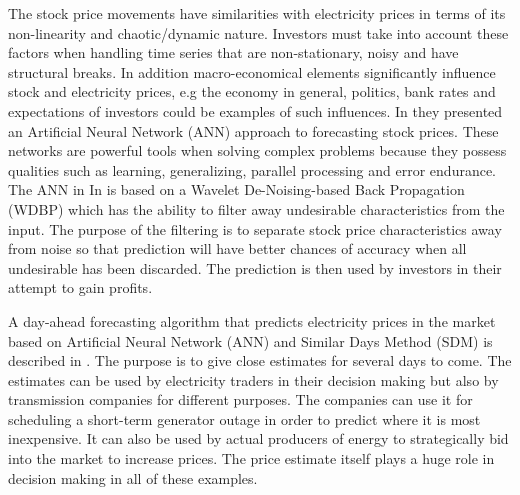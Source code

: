 The stock price movements have similarities with electricity prices in terms of its non-linearity and chaotic/dynamic nature. Investors must take into account these factors when handling time series that are non-stationary, noisy and have structural breaks\cite{stockForecasting}. In addition macro-economical elements significantly influence stock and electricity prices, e.g the economy in general, politics, bank rates and expectations of investors could be examples of such influences. In \cite{stockForecasting} they presented an Artificial Neural Network (ANN) approach to forecasting stock prices. These networks are powerful tools when solving complex problems because they possess qualities such as learning, generalizing, parallel processing and error endurance. The ANN in In \cite{stockForecasting} is based on a Wavelet De-Noising-based Back Propagation (WDBP) which has the ability to filter away undesirable characteristics from the input. The purpose of the filtering is to separate stock price characteristics away from noise so that prediction will have better chances of accuracy when all undesirable has been discarded. The prediction is then used by investors in their attempt to gain profits. 

A day-ahead forecasting algorithm that predicts electricity prices in the market based on Artificial Neural Network (ANN) and Similar Days Method (SDM) is described in \cite{pjmForecast}. The purpose is to give close estimates for several days to come. The estimates can be used by electricity traders in their decision making but also by transmission companies for different purposes. The companies can use it for scheduling a short-term generator outage in order to predict where it is most inexpensive. It can also be used by actual producers of energy to strategically bid into the market to increase prices. The price estimate itself plays a huge role in decision making in all of these examples.

